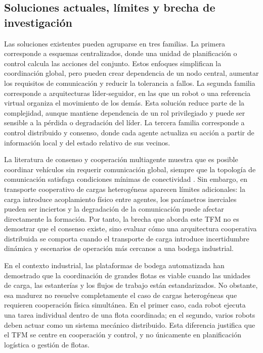 \documentclass[12pt,a4paper]{article}
\begin{document}
\subsection{Soluciones actuales, límites y brecha de investigación}

Las soluciones existentes pueden agruparse en tres familias. La primera corresponde a esquemas centralizados, donde una unidad de planificación o control calcula las acciones del conjunto. Estos enfoques simplifican la coordinación global, pero pueden crear dependencia de un nodo central, aumentar los requisitos de comunicación y reducir la tolerancia a fallos. La segunda familia corresponde a arquitecturas líder-seguidor, en las que un robot o una referencia virtual organiza el movimiento de los demás. Esta solución reduce parte de la complejidad, aunque mantiene dependencia de un rol privilegiado y puede ser sensible a la pérdida o degradación del líder. La tercera familia corresponde a control distribuido y consenso, donde cada agente actualiza su acción a partir de información local y del estado relativo de sus vecinos.

La literatura de consenso y cooperación multiagente muestra que es posible coordinar vehículos sin requerir comunicación global, siempre que la topología de comunicación satisfaga condiciones mínimas de conectividad \cite{olfati2007consensus,ren2008distributed}. Sin embargo, en transporte cooperativo de cargas heterogéneas aparecen límites adicionales: la carga introduce acoplamiento físico entre agentes, los parámetros inerciales pueden ser inciertos y la degradación de la comunicación puede afectar directamente la formación. Por tanto, la brecha que aborda este TFM no es demostrar que el consenso existe, sino evaluar cómo una arquitectura cooperativa distribuida se comporta cuando el transporte de carga introduce incertidumbre dinámica y escenarios de operación más cercanos a una bodega industrial.

En el contexto industrial, las plataformas de bodega automatizada han demostrado que la coordinación de grandes flotas es viable cuando las unidades de carga, las estanterías y los flujos de trabajo están estandarizados. No obstante, esa madurez no resuelve completamente el caso de cargas heterogéneas que requieren cooperación física simultánea. En el primer caso, cada robot ejecuta una tarea individual dentro de una flota coordinada; en el segundo, varios robots deben actuar como un sistema mecánico distribuido. Esta diferencia justifica que el TFM se centre en cooperación y control, y no únicamente en planificación logística o gestión de flotas.
\end{document}
